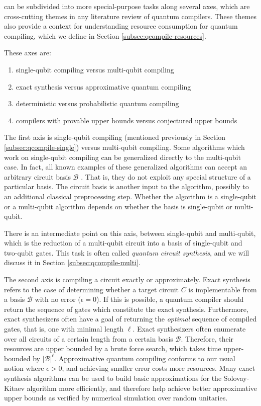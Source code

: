 can be subdivided into more special-purpose tasks along several axes,
which are cross-cutting themes in any literature review of quantum compilers.
These themes also provide a context for understanding resource consumption
for quantum compiling, which we define in Section \ref{subsec:qcompile-resources}.

These axes are:

\begin{enumerate}
\item single-qubit compiling versus multi-qubit compiling
\item exact synthesis versus approximative quantum compiling
\item deterministic versus probabilistic quantum compiling
\item compilers with provable upper bounds versus conjectured upper bounds
\end{enumerate}

The first axis is 
single-qubit compiling
(mentioned previously in Section \ref{subsec:qcompile-single}) versus
multi-qubit compiling. Some algorithms which work on single-qubit compiling
can be generalized directly to the multi-qubit case. In fact, all known
examples of these generalized algorithms can accept an arbitrary circuit
basis $\mathcal{B}$ \cite{Amy2012,Solovay1995,Fowler2011,Booth2012}.
That is, they do not exploit any special structure of
a particular basis. The circuit basis is another input to the algorithm,
possibly to an additional classical preprocessing step. Whether the algorithm
is a single-qubit or a multi-qubit algorithm depends on whether the basis
is single-qubit or multi-qubit.

There is an intermediate point on this axis, between single-qubit and multi-qubit,
which is the reduction of a multi-qubit circuit into a basis of
single-qubit and two-qubit gates. This task is often called \emph{quantum circuit synthesis},
and we will discuss it in Section \ref{subsec:qcompile-multi}.

The second axis is compiling a circuit exactly or approximately.
Exact synthesis refers to the case of determining whether a
target circuit $C$ is implementable from a basis $\mathcal{B}$
with no error ($\epsilon = 0$). If this is possible, a quantum compiler
should return the sequence of gates which constitute the exact
synthesis. Furthermore, exact synthesizers often have a goal of
returning the \emph{optimal} sequence of compiled gates, that is,
one with minimal length $\ell$.
Exact synthesizers often enumerate over all circuits of
a certain length from a certain basis $\mathcal{B}$. Therefore, their
resources are upper bounded by a brute force search, which takes
time upper-bounded by $|\mathcal{B}|^{\ell}$.
Approximative quantum compiling conforms to our usual notion where
$\epsilon > 0$, and achieving smaller error costs more resources. Many
exact synthesis algorithms can be used to build basic approximations
for the Solovay-Kitaev algorithm more efficiently, and therefore help
achieve better approximative upper bounds as verified by numerical
simulation over random unitaries.

